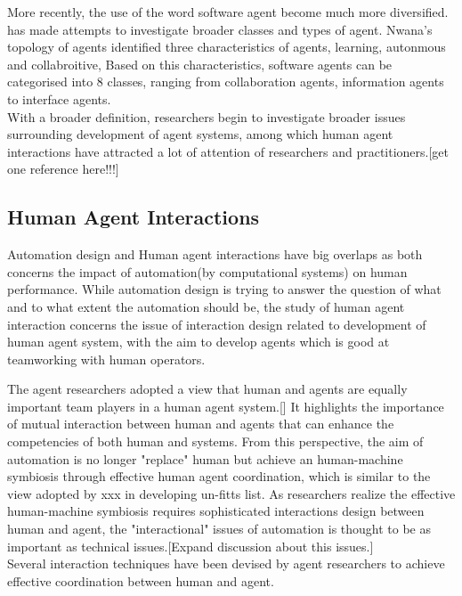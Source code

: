 More recently, the use of the word software agent become much more diversified. \cite{Nwana1996} has made attempts to investigate broader classes and types of agent. Nwana's \cite{Nwana1996} topology of agents identified three characteristics of agents, learning, autonmous and collabroitive, Based on this characteristics, software agents can be categorised into 8 classes, ranging from collaboration agents, information agents to interface agents. \\

With a broader definition, researchers begin to investigate broader issues surrounding development of agent systems, among which human agent interactions have attracted a lot of attention of researchers and practitioners.[get one reference here!!!]

\subsection{ Human Agent Interactions }

Automation design and Human agent interactions have big overlaps as both concerns the impact of automation(by computational systems) on human performance. While automation design is trying to answer the question of what and to what extent the automation should be, the study of human agent interaction concerns the issue of interaction design related to development of human agent system, with the aim to develop agents which is good at teamworking with human operators. 

The agent researchers adopted a view that human and agents are equally important team players in a human agent system.[] It highlights the importance of mutual interaction between human and agents that can enhance the competencies of both human and systems. From this perspective, the aim of automation is no longer "replace" human but achieve an human-machine symbiosis through effective human agent coordination, which is similar to the view adopted by xxx in developing un-fitts list. As researchers realize the effective human-machine symbiosis requires sophisticated interactions design between human and agent, the "interactional" issues of automation is thought to be as important as technical issues.[Expand discussion about this issues.] \cite{Bradshaw2011} \\

Several interaction techniques have been devised by agent researchers to achieve effective coordination between human and agent. 


